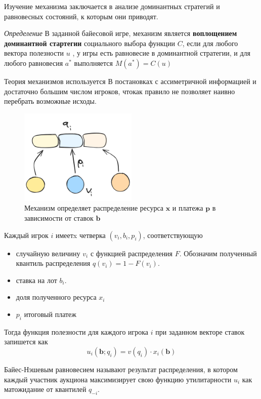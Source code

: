 Изучение механизма заключается в анализе доминантных стратегий и равновесных состояний, к которым они приводят. 

\textit{Определение} В заданной байесовой игре, механизм является \textbf{воплощением доминантной стартегии} 
социального выбора функции $C$, если для любого вектора полезности $u$ , 
у игры есть равновесие в доминантной стратегии, и для любого равновесия $a^*$ выполняется $M(a^*) = C(u)$


Теория механизмов используется В постановках с ассиметричной информацией
и достаточно большим числом игроков, чтокак правило не позволяет наивно перебрать возможные исходы.

\begin{figure}[h]
    \centering
    \includegraphics[width=0.5\textwidth]{assets/pedagogic/social/mech.excalidraw.png}
    \caption{Механизм определяет распределение ресурса $\mathbf{x}$ и платежа $\mathbf{p}$ в зависимости от ставок $\mathbf{b}$}
    \label{utility}
\end{figure}

Каждый игрок $i$ имеетx четверка $(v_i,b_i,p_i)$, соответствующую \begin{itemize}
    \item случайную величину $v_i$ с функцией распределения $F$. Обозначим полученный квантиль распределения $q(v_i) = 1 - F(v_i)$.
    \item ставка на лот $b_i$.
    \item доля полученного ресурса $x_i$
    \item $p_i$ итоговый платеж
\end{itemize}

Тогда функция полезности для каждого игрока $i$ при заданном векторе ставок запишется как 
\begin{equation}
    u_i(\mathbf{b};q_i) = v(q_i) \cdot x_i(\mathbf{b})   
\end{equation}

\textit{} Байес-Нэшевым равновесием называют результат распределения, в котором каждый участник аукциона
максимизирует свою функцию утилитарности $u_i$ как матожидание от квантилей $q_{-i}$.

